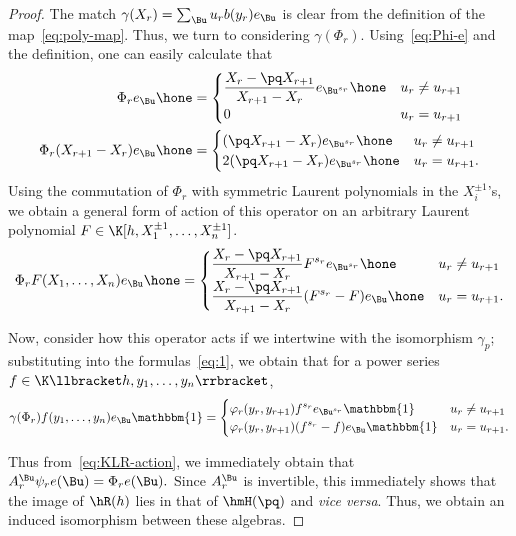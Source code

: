 \begin{proof} 
The match $\gamma(X_r)=\sum_{\Bu}u_rb(y_r)e_{\Bu}$ is clear from
the definition of the map~\eqref{eq:poly-map}. Thus, we turn to considering $\gamma(\Phi_r)$.
Using~\eqref{eq:Phi-e} and the definition, one
can easily calculate that
\begin{align*}
 \Phi_r e_{\Bu} \hone&=
 \begin{cases}
 \displaystyle \frac{X_r-\pq X_{r+1}}{X_{r+1}-X_r}
 e_{\Bu^{s_r}} \hone& u_r\neq u_{r+1}\\
 0 & u_r= u_{r+1}
 \end{cases}\\
 \Phi_r (X_{r+1}-X_r) e_{\Bu}\hone&=
 \begin{cases}
 (\pq X_{r+1}-X_r) e_{\Bu^{s_r}} \hone & u_r\neq u_{r+1}\\2(\pq X_{r+1}-X_r)e_{\Bu^{s_r}} \hone& u_r= u_{r+1}.
 \end{cases}
\end{align*}
Using the commutation of $\Phi_r$ with symmetric Laurent polynomials
in the $X_i^{\pm 1}$'s, we obtain a general form of action of this
operator on an
arbitrary Laurent polynomial $F\in \K[h,X_1^{\pm 1},\dots, X_n^{\pm
 1}]$. 
\begin{equation}
\Phi_r F(X_1,\dots,X_n) e_{\Bu} \hone =
\begin{cases}
 \displaystyle \frac{X_r-\pq X_{r+1}}{X_{r+1}-X_r}F^{s_r}
 e_{\Bu^{s_r}} \hone& u_r\neq u_{r+1}\\
\displaystyle\frac{X_{r}- \pq X_{r+1}}{X_{r+1}-X_r}(F^{s_r}-F) e_{\Bu}
\hone & u_r= u_{r+1}.
\end{cases}\label{eq:1}
\end{equation}

 Now, consider how this operator acts if we intertwine with the
 isomorphism $\gamma_p$; substituting into the formulas~\eqref{eq:1},
 we obtain that for a power series $f\in \K\llbracket h,y_1,\dots, y_n\rrbracket $, 
\[\gamma(\Phi_r) f(y_1,\dots, y_n)e_{\Bu}\mathbbm{1} =\begin{cases}
 \displaystyle \varphi_r(y_r,y_{r+1})f^{s_r}
 e_{\Bu^{s_r}} \mathbbm{1}& u_r\neq u_{r+1}\\
\displaystyle \varphi_r(y_r,y_{r+1})
 ( f^{s_r}-f )e_{\Bu}\mathbbm{1}& u_r= u_{r+1}.
\end{cases}
\]


Thus from~\eqref{eq:KLR-action}, 
we immediately obtain that $A^{\Bu}_{r}\psi_r e(\Bu)=\Phi_r e(\Bu).$
Since $A^\Bu_r$ is invertible, this immediately shows that the image
of $\hR(h)$ lies in that of $\hmH(\pq)$ and \emph{vice versa}. Thus, we
obtain an induced isomorphism between these algebras.
\end{proof}
